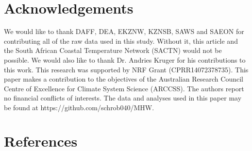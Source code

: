 \documentclass[a4paper,10pt,review]{elsarticle}
\begin{document}
\section*{Acknowledgements}
We would like to thank DAFF, DEA, EKZNW, KZNSB, SAWS and SAEON for contributing all of the raw data used in this study. Without it, this article and the South African Coastal Temperature Network (SACTN) would not be possible. We would also like to thank Dr. Andries Kruger for his contributions to this work. This research was supported by NRF Grant (CPRR14072378735). This paper makes a contribution to the objectives of the Australian Research Council Centre of Excellence for Climate System Science (ARCCSS). The authors report no financial conflicts of interests. The data and analyses used in this paper may be found at https://github.com/schrob040/MHW. 


\section*{References}





\end{document}
